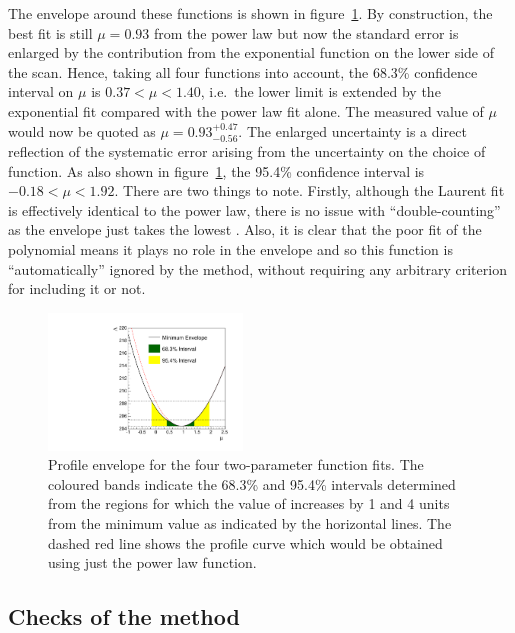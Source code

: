 The envelope around these functions is shown in
figure~\ref{fig:functions:envelope}.
By construction, the best fit is still $\mu=0.93$ from the power law
but now the standard error is enlarged by the contribution from the exponential function
on the lower side of the scan. Hence, taking all four functions into
account, the 68.3\% confidence interval on $\mu$ is
$0.37 < \mu < 1.40 $, i.e.~the lower limit is extended by
the exponential fit
compared with the power law fit alone.
The measured value of $\mu$ would now be quoted as
$\mu = 0.93_{-0.56}^{+0.47}$.
The enlarged uncertainty is a direct reflection of the
systematic error arising from the uncertainty on the choice of function.
As also shown in figure~\ref{fig:functions:envelope}, the 95.4\% confidence
interval is $-0.18 < \mu < 1.92$.
There are two things to note. Firstly, although the Laurent fit
is effectively identical to the power law, there is no issue with
``double-counting'' as the envelope just takes the lowest \nll.
Also, it is clear that the poor fit of the polynomial
means it plays no role in the envelope and so this function is
``automatically'' ignored by the method,
without requiring any arbitrary criterion for
including it or not.
%
\begin{figure}[tbp]
\centering
\includegraphics[width=0.46\textwidth]{functions/Envelope.pdf}
\caption{Profile \nll envelope for the four two-parameter function fits.
The coloured bands indicate the 68.3\% and 95.4\% intervals determined from the regions
for which the value of \nll increases by 1 and 4 units from the minimum value as indicated by the horizontal lines. The dashed red line shows the profile \nll
curve which would be obtained using just the power law function.}
\label{fig:functions:envelope}
\end{figure}


\subsection{Checks of the method}
\label{sec:functions:coverage}

